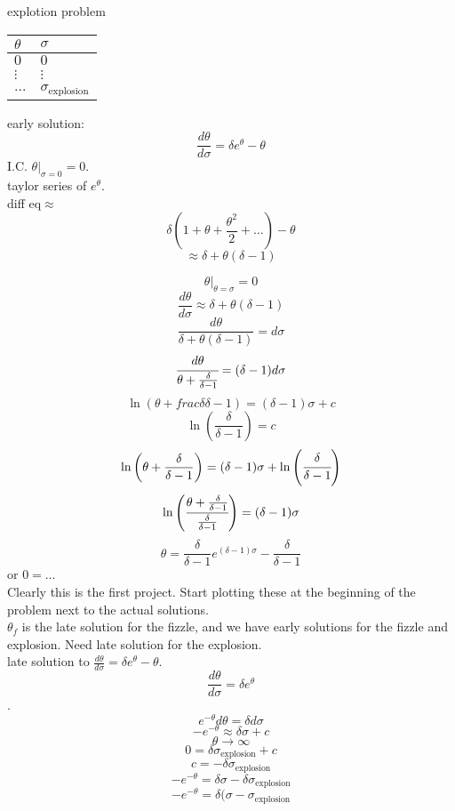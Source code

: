 \documentclass{article}
\begin{document}
explotion problem
\begin{table}[h!]
    \centering
    \begin{tabular}{l|l}
        $\theta$ & $\sigma$\\ \hline
        $0$ & $0$\\
        $\vdots$ & $\vdots$\\
        $\dots$ & $\sigma_{\text{explosion}}$\\
    \end{tabular}
\end{table}

early solution:\\
\[\frac{d\theta}{d\sigma}=\delta e^{\theta}-\theta\]
I.C. $\theta\bigg|_{\sigma=0}=0$.\\
taylor series of $e^{\theta}$.\\
diff eq$\approx$
\[\delta (1+\theta+\frac{\theta^2}{2}+\dots)-\theta\]
\[\approx \delta+\theta(\delta-1)\]

\[\theta\bigg|_{\theta=\sigma}=0\]
\[\frac{d \theta}{d\sigma}\approx \delta+\theta(\delta-1)\]
\[\frac{d\theta}{\delta+\theta(\delta-1)}=d\sigma\]
\[\cfrac{d\theta}{\theta+\frac{\delta}{\delta-1}}=(\delta-1)d\sigma\]
\[\ln \left (\theta+frac{\delta}{\delta-1}\right )=(\delta-1)\sigma +c\]
\[\ln\left (\frac{\delta}{\delta-1}\right )=c\]
\[\ln\left (\theta+\frac{\delta}{\delta-1}\right )=(\delta-1)\sigma+\ln \left (\cfrac{\delta}{\delta-1}\right )\]
\[\ln\left (\cfrac{\theta+\frac{\delta}{\delta-1}}{\frac{\delta}{\delta-1}}\right )=(\delta-1)\sigma\]
\[\theta=\frac{\delta}{\delta-1}e^{(\delta-1)\sigma}-\frac{\delta}{\delta-1}\]
or $0=\dots$\\

Clearly this is the first project. Start plotting these at the beginning of the problem next to the actual solutions.\\
$\theta_f$ is the late solution for the fizzle, and we have early solutions for the fizzle and explosion. Need late solution for the explosion.\\

late solution to $\frac{d\theta}{d\sigma}=\delta e^{\theta}-\theta$.\\
\[\frac{d\theta}{d\sigma}=\delta e^{\theta}\].\\
\[e^{-\theta}d\theta=\delta d\sigma\]
\[-e^{-\theta}\approx \delta\sigma +c\]
\[\theta\to \infty\]
\[0=\delta \sigma_{\text{explosion}}+c\]
\[c=-\delta \sigma_{\text{explosion}}\]
\[-e^{-\theta}=\delta \sigma -\delta\sigma_{\text{explosion}}\]
\[-e^{-\theta}=\delta(\sigma-\sigma_{\text{explosion}}\]
\end{document}
